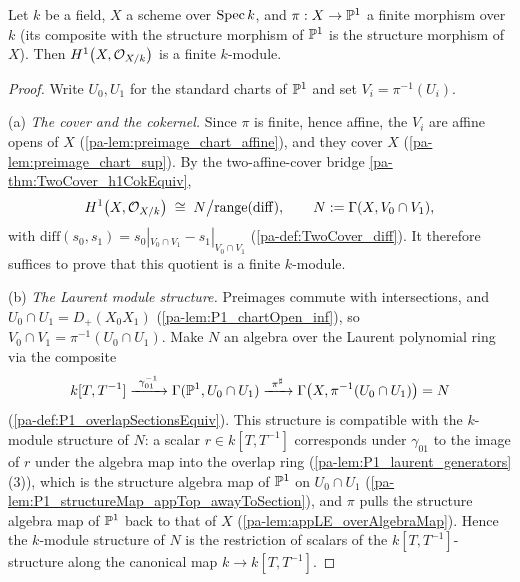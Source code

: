 \begin{theorem}
  \label{pa-thm:moduleFinite_hModule_one_of_isFinite_toP1}
  \leanok


  Let \(k\) be a field, \(X\) a scheme over \(\operatorname{Spec} k\), and \(\pi : X \to \mathbb{P}^1\) a
  finite morphism over \(k\) (its composite with the structure morphism of \(\mathbb{P}^1\) is
  the structure morphism of \(X\)). Then \(H^1\bigl(X, \mathcal{O}_{X/k}\bigr)\) is a finite
  \(k\)-module.
\end{theorem}
\begin{proof}
  \leanok
  Write \(U_0, U_1\) for the standard charts of \(\mathbb{P}^1\) and set
  \(V_i = \pi^{-1}(U_i)\).

  (a) \emph{The cover and the cokernel.} Since \(\pi\) is finite, hence affine, the
  \(V_i\) are affine opens of \(X\) (\ref{pa-lem:preimage_chart_affine}), and they cover
  \(X\) (\ref{pa-lem:preimage_chart_sup}). By the two-affine-cover bridge
  \ref{pa-thm:TwoCover_h1CokEquiv},
  \[
    H^1\bigl(X, \mathcal{O}_{X/k}\bigr) \;\cong\;
      N \big/ \mathrm{range}(\mathrm{diff}),
    \qquad N := \Gamma(X, V_0 \cap V_1),
  \]
  with \(\mathrm{diff}(s_0, s_1) = s_0|_{V_0 \cap V_1} - s_1|_{V_0 \cap V_1}\)
  (\ref{pa-def:TwoCover_diff}). It therefore suffices to prove that this quotient is a
  finite \(k\)-module.

  (b) \emph{The Laurent module structure.} Preimages commute with intersections, and
  \(U_0 \cap U_1 = D_+(X_0X_1)\) (\ref{pa-lem:P1_chartOpen_inf}), so
  \(V_0 \cap V_1 = \pi^{-1}(U_0 \cap U_1)\). Make \(N\) an algebra over the Laurent
  polynomial ring via the composite
  \[
    k[T, T^{-1}] \xrightarrow{\ \gamma_{01}^{-1}\ } \Gamma(\mathbb{P}^1, U_0 \cap U_1)
      \xrightarrow{\ \pi^\sharp\ } \Gamma\bigl(X, \pi^{-1}(U_0 \cap U_1)\bigr) = N
  \]
  (\ref{pa-def:P1_overlapSectionsEquiv}). This structure is compatible with the \(k\)-module
  structure of \(N\): a scalar \(r \in k[T,T^{-1}]\) corresponds under \(\gamma_{01}\) to
  the image of \(r\) under the algebra map into the overlap ring
  (\ref{pa-lem:P1_laurent_generators}(3)), which is the structure algebra map of \(\mathbb{P}^1\)
  on \(U_0 \cap U_1\) (\ref{pa-lem:P1_structureMap_appTop_awayToSection}), and \(\pi\) pulls
  the structure algebra map of \(\mathbb{P}^1\) back to that of \(X\)
  (\ref{pa-lem:appLE_overAlgebraMap}). Hence the \(k\)-module structure of \(N\) is the
  restriction of scalars of the \(k[T,T^{-1}]\)-structure along the canonical map
  \(k \to k[T,T^{-1}]\).


\end{proof}
